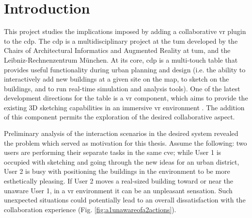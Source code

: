 
\chapter{Introduction}





This project studies the implications imposed by adding a collaborative \gls{vr} plugin to the \gls{cdp}.
The \gls{cdp} is a multidisciplinary project at the \gls{tum} developed by the Chairs of Architectural Informatics and Augmented Reality at \gls{tum}, and the Leibniz-Rechnenzentrum M{\"u}nchen.
At its core, \gls{cdp} is a multi-touch table that provides useful functionality during urban planning and design (i.e. the ability to interactively add new buildings at a given site on the map, to sketch on the buildings, and to run real-time simulation and analysis tools). One of the latest  development directions for the table is a \gls{vr} component, which aims to provide the existing 3D sketching capabilities in an immersive \gls{vr} environment \parencite{lampe_cdp//vr-sketching_2017}. 
The addition of this component permits the exploration of the desired collaborative aspect.

Preliminary analysis of the interaction scenarios in the desired system revealed the problem which served as motivation for this thesis. Assume the following: two users are performing their separate tasks in the same \gls{cve}; while User 1 is occupied with sketching and going through the new ideas for an urban district, User 2 is busy with positioning the buildings in the environment to be more esthetically pleasing. If User 2 moves a real-sized building toward or near the unaware User 1, in a \gls{vr} environment it can be an unpleasant sensation. Such unexpected situations could potentially lead to an overall dissatisfaction with the collaboration experience (Fig. \ref{fig:a1unawareofa2actions}).

